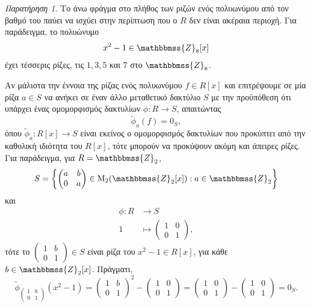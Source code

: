 \documentclass[12pt,a4paper,reqno]{amsart}
\theoremstyle{definition}
\theoremstyle{remark}
\newtheorem*{remark}{Παρατήρηση}
\numberwithin{theorem}{section}
\numberwithin{exercise}{section}
\numberwithin{equation}{section}
\newcommand{\ZZ}{\mathbbmss{Z}}
\newcommand{\rmM}{\mathrm{M}}
\renewcommand{\to}{\rightarrow}
\begin{document}
\begin{remark}
    Το άνω φράγμα στο πλήθος των ριζών ενός πολυωνύμου από τον βαθμό του παύει να ισχύει στην περίπτωση που ο $R$ δεν είναι ακέραια περιοχή. Για παράδειγμα, το πολυώνυμο 
    \[
    x^2 - 1 \in \ZZ_8[x]
    \]
    έχει τέσσερις ρίζες, τις $1, 3, 5$ και $7$ στο $\ZZ_8$. 
    
    Αν μάλιστα  την έννοια της ρίζας ενός πολυωνύμου $f \in R[x]$ και επιτρέψουμε σε μία ρίζα $a \in S$ να ανήκει σε έναν άλλο μεταθετικό δακτύλιο $S$ με την προϋπόθεση ότι υπάρχει ένας ομομορφισμός δακτυλίων $\phi : R \to S$, απαιτώντας 
    \[
    \tilde{\phi}_a(f) = 0_S,
    \]
    όπου $\tilde{\phi}_a : R[x] \to S$ είναι εκείνος ο ομομορφισμός δακτυλίων που προκύπτει από την καθολική ιδιότητα του $R[x]$, τότε μπορούν να προκύψουν ακόμη και άπειρες ρίζες. Για παράδειγμα, για $R = \ZZ_2$, 
    \[
    S = \left\{\begin{pmatrix}
        a & b \\ 
        0 & a
    \end{pmatrix} \in \rmM_2(\ZZ_2[x]) : a \in \ZZ_2 \right\}
    \]
    και
    \begin{align*}
        \phi : R &\to S \\
                1  &\mapsto \begin{pmatrix}
                    1 & 0 \\ 
                    0 & 1
                \end{pmatrix},
    \end{align*}
    τότε το $\left(\begin{smallmatrix}
    1 & b \\ 
    0 & 1
    \end{smallmatrix}\right) \in S$ είναι ρίζα του $x^2 -1 \in R[x]$, για κάθε $b \in \ZZ_2[x]$. Πράγματι, 
    \[
    \tilde{\phi}_{\left(\begin{smallmatrix}
    1 & b \\ 
    0 & 1
    \end{smallmatrix}\right)}(x^2 - 1) = 
    \begin{pmatrix}
        1 & b \\ 
        0 & 1
    \end{pmatrix}^2 - \begin{pmatrix}
        1 & 0 \\ 
        0 & 1
    \end{pmatrix} = 
    \begin{pmatrix}
        1 & 0 \\ 
        0 & 1
    \end{pmatrix}
    -
    \begin{pmatrix}
        1 & 0 \\ 
        0 & 1
    \end{pmatrix}
    = 0_S.
    \]
\end{remark}
\end{document}
